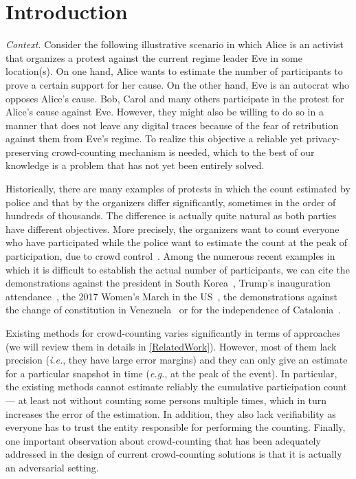 \section{Introduction}%
\label{Introduction}

\emph{Context.} Consider the following illustrative scenario in which Alice is an activist that organizes a protest against the current regime leader Eve in some location(s).
On one hand, Alice wants to estimate the number of participants to prove a certain support for her cause.
On the other hand, Eve is an autocrat who opposes Alice's cause.
Bob, Carol and many others participate in the protest for Alice's cause against Eve.
However, they might also be willing to do so in a manner that does not leave any digital traces because of the fear of retribution against them from Eve's regime. 
To realize this objective a reliable yet privacy-preserving crowd-counting mechanism is needed, which to the best of our knowledge is a problem that has not yet been entirely solved.

Historically, there are many examples of protests in which the count estimated by police and that by the organizers 
differ significantly, sometimes in the order of hundreds of thousands.
The difference is actually quite natural as both parties have different objectives.
More precisely, the organizers want to count everyone who have participated while the police want to estimate the count at the peak of participation, due to crowd control~\cite{2016DemonstrationsInSeoul}.
Among the numerous recent examples in which it is difficult to establish the actual number of participants, we can cite the demonstrations against the president in South Korea~\cite{2016DemonstrationsInSeoul}, Trump's inauguration attendance~\cite{HowWillWeKnowTrumpInauguralCrowdSize}, the 2017 Women's March in the US~\cite{2017WomensMarchesInUS}, the demonstrations against the change of constitution in Venezuela~\cite{AlJazeeraOnVenezuela2017} or for the independence of Catalonia~\cite{CataloniaDemonstrations}.

Existing methods for crowd-counting varies significantly in terms of approaches (we will review them in details in \cref{RelatedWork}).
However, most of them lack precision (\emph{i.e.}, they have large error margins) and they can only give an estimate for a particular snapshot in time (\emph{e.g.}, at the peak of the event). 
In particular, the existing methods cannot estimate reliably the cumulative participation count --- at least not without counting some persons multiple times, which in turn increases the error of the estimation.
In addition, they also lack verifiability as everyone has to trust the entity responsible for performing the counting.
Finally, one important observation about crowd-counting that has been adequately addressed in the design of current crowd-counting solutions is that it is actually an adversarial setting. 


